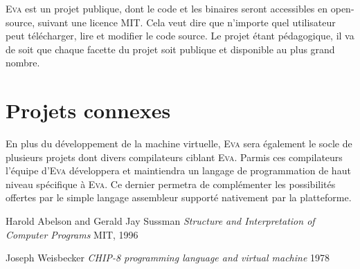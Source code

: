 \documentclass[11pt,twoside,french]{article}
\newcommand{\noun}[1]{\textsc{#1}}
\begin{document}
\noun{Eva} est un projet publique, dont le code et les binaires seront
accessibles en open-source, suivant une licence MIT. Cela veut dire
que n'importe quel utilisateur peut télécharger, lire et modifier
le code source. Le projet étant pédagogique, il va de soit que chaque
facette du projet soit publique et disponible au plus grand nombre.

\section{Projets connexes}

En plus du développement de la machine virtuelle, \noun{Eva} sera
également le socle de plusieurs projets dont divers compilateurs ciblant
\noun{Eva}. Parmis ces compilateurs l'équipe d'\noun{Eva} développera et maintiendra
un langage de programmation de haut niveau spécifique à \noun{Eva}. Ce dernier
permetra de complémenter les possibilités offertes par le simple langage
assembleur supporté nativement par la platteforme.


\newpage{}

\begin{thebibliography}{XXXXXX}
\label{chap:bib}

 Harold Abelson and Gerald Jay Sussman
\emph{Structure and Interpretation of Computer Programs} MIT, 1996

 Joseph Weisbecker
\emph{CHIP-8 programming language and virtual machine} 1978

\end{thebibliography}
\end{document}
